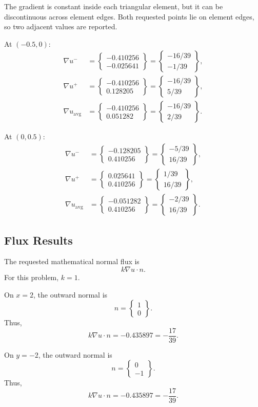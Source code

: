 \documentclass[14pt,a4paper]{article}
\newcommand{\grad}{\nabla}
\newcommand{\vect}[1]{\begin{Bmatrix}#1\end{Bmatrix}}
\begin{document}
The gradient is constant inside each triangular element, but it can be discontinuous across element edges. Both requested points lie on element edges, so two adjacent values are reported.

At $(-0.5,0)$:
\begin{align}
    \grad u^{-} &= \vect{-0.410256\\-0.025641}
    =\vect{-16/39\\-1/39},\\
    \grad u^{+} &= \vect{-0.410256\\0.128205}
    =\vect{-16/39\\5/39},\\
    \grad u_{\mathrm{avg}} &= \vect{-0.410256\\0.051282}
    =\vect{-16/39\\2/39}.
\end{align}

At $(0,0.5)$:
\begin{align}
    \grad u^{-} &= \vect{-0.128205\\0.410256}
    =\vect{-5/39\\16/39},\\
    \grad u^{+} &= \vect{0.025641\\0.410256}
    =\vect{1/39\\16/39},\\
    \grad u_{\mathrm{avg}} &= \vect{-0.051282\\0.410256}
    =\vect{-2/39\\16/39}.
\end{align}

\subsection{Flux Results}

The requested mathematical normal flux is
\begin{equation}
    k\grad u\cdot n.
\end{equation}
For this problem, $k=1$.

On $x=2$, the outward normal is
\begin{equation}
    n=\vect{1\\0}.
\end{equation}
Thus,
\begin{equation}
    k\grad u\cdot n=-0.435897=-\frac{17}{39}.
\end{equation}

On $y=-2$, the outward normal is
\begin{equation}
    n=\vect{0\\-1}.
\end{equation}
Thus,
\begin{equation}
    k\grad u\cdot n=-0.435897=-\frac{17}{39}.
\end{equation}
\end{document}
